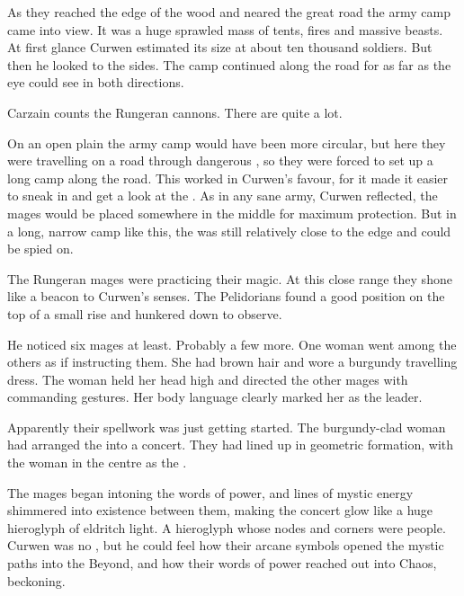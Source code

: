 As they reached the edge of the wood and neared the great road the army camp came into view. 
It was a huge sprawled mass of tents, fires and massive beasts. 
At first glance Curwen estimated its size at about ten thousand soldiers. 
But then he looked to the sides. 
The camp continued along the road for as far as the eye could see in both directions. 


Carzain counts the Rungeran cannons. 
There are quite a lot. 

On an open plain the army camp would have been more circular, but here they were travelling on a road through dangerous \Wylde{}, so they were forced to set up a long camp along the road. 
This worked in Curwen's favour, for it made it easier to sneak in and get a look at the \ishrah. 
As in any sane army, Curwen reflected, the mages would be placed somewhere in the middle for maximum protection. 
But in a long, narrow camp like this, the  was still relatively close to the edge and could be spied on. 

The Rungeran mages were practicing their magic. 
At this close range they shone like a beacon to Curwen's senses. 
The Pelidorians found a good position on the top of a small rise and hunkered down to observe. 

He noticed six mages at least. 
Probably a few more. 
One woman went among the others as if instructing them. 
She had brown hair and wore a burgundy travelling dress. 
The woman held her head high and directed the other mages with commanding gestures. 
Her body language clearly marked her as the \ishrah{} leader. 


Apparently their spellwork was just getting started. 
The burgundy-clad woman had arranged the \ishrah{} into a concert. 
They had lined up in geometric formation, with the woman in the centre as the \apex. 

The mages began intoning the \draconic{} words of power, and lines of mystic energy shimmered into existence between them, making the concert glow like a huge hieroglyph of eldritch light. 
A hieroglyph whose nodes and corners were people. 
Curwen was no \rethyax, but he could feel how their arcane symbols opened the mystic paths into the Beyond, and how their words of power reached out into Chaos, beckoning. 

